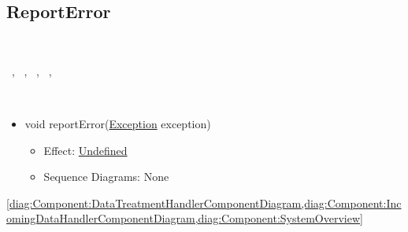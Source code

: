   \subsection{ReportError}\label{int:InterfacesReportError}
    \begin{description}
      \item[Provided by:] \iconcomponent{}~
      \item[Required by:] \iconcomponent{}~, \iconcomponent{}~, \iconcomponent{}~, \iconcomponent{}~, \iconcomponent{}~ 
      \item[Operations:] ~
    \begin{itemize}[noitemsep,nolistsep,leftmargin=-.25cm]
      \item \textsf{void reportError({\colorbox{red!30}{\underline{Exception}}} exception)}
        \begin{itemize}[noitemsep,nolistsep]
           \item Effect: {\colorbox{red!30}{\underline{Undefined}}} 
           \item Sequence Diagrams: None
        \end{itemize}
    \end{itemize}
      \item[Diagrams:] \cref{diag:Component:DataTreatmentHandlerComponentDiagram,diag:Component:IncomingDataHandlerComponentDiagram,diag:Component:SystemOverview}
    \end{description}

